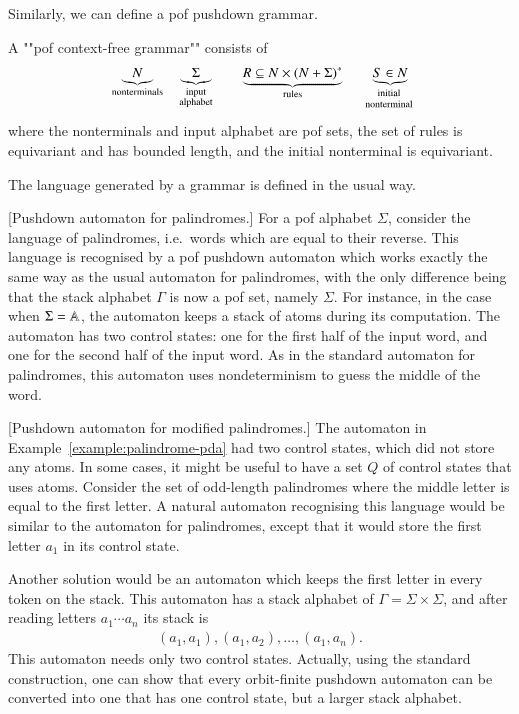 Similarly, we can define a pof pushdown grammar.
\begin{definition}
	A ""pof context-free grammar"" consists of 
	\begin{align*}
		\underbrace{N}_{\text{nonterminals}} \quad   \underbrace{\Sigma}_{\substack{\text{input}\\ \text{alphabet}}}  \qquad  \underbrace{R \subseteq N \times (N + \Sigma)^*}_{\text{rules}} 
		\qquad \myunderbrace{S \in N}{initial\\ nonterminal}
	  \end{align*}
	where the nonterminals and input alphabet are pof sets, the set of rules is equivariant and has bounded length, and the initial nonterminal is equivariant.
\end{definition}
The language generated by a grammar  is defined in the usual way. 




\begin{myexample}\label{example:palindrome-pda}[Pushdown automaton for palindromes.]
	For a pof alphabet $\Sigma$, consider the language of palindromes, i.e.~words which are equal to their reverse.
	This language is recognised by a pof pushdown automaton which works exactly the same way as the usual automaton for palindromes, with the only difference being that the stack alphabet $\Gamma$ is now a pof  set, namely  $\Sigma$. For instance, in the case when $\Sigma = \mathbb A$, the automaton keeps a stack of atoms during its computation. The automaton has two control states: one for the first half of the input word, and one for the second half of the input  word. As in the standard automaton for palindromes, this automaton uses nondeterminism to guess the middle of the word.
	\end{myexample}
	
	
	\begin{myexample}\label{example:mid-palindrome-pda}[Pushdown automaton for modified palindromes.]
		The automaton in Example~\ref{example:palindrome-pda} had two control states, which did not store any atoms. In some cases, it might be useful to have a set $Q$ of control states that uses atoms. Consider  the set of odd-length palindromes where the middle letter is equal to the first letter. 
		A natural automaton  recognising this language would be similar to the automaton for palindromes, except that it would store the first letter $a_1$ in its control state. 
		
		Another solution would be an automaton which keeps the first letter in every token on the stack. This automaton has a stack alphabet of $\Gamma = \Sigma \times \Sigma$, and after reading letters $a_1 \cdots a_n$ its stack is
		\begin{align*}
			(a_1,a_1),(a_1,a_2),\ldots,(a_1,a_n).
		\end{align*}
		This automaton needs only two control states. Actually, using the standard construction, one can show that every orbit-finite pushdown automaton  can be converted into one that has one control state, but a larger stack alphabet.
	\end{myexample}
	
